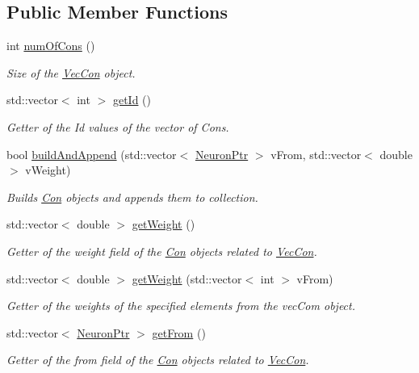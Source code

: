 \subsection*{Public Member Functions}
\begin{DoxyCompactItemize}
\item 
int \hyperlink{class_vec_con_aa9a397520b07fbeead0b6d252c1ea882}{numOfCons} ()
\begin{DoxyCompactList}\small\item\em Size of the \hyperlink{class_vec_con}{VecCon} object. \end{DoxyCompactList}\item 
std::vector$<$ int $>$ \hyperlink{class_vec_con_a03d5dde143e166e68b01c9596573eb5f}{getId} ()
\begin{DoxyCompactList}\small\item\em Getter of the Id values of the vector of Cons. \end{DoxyCompactList}\item 
bool \hyperlink{class_vec_con_a2ab58248509550b1c99435a90ece59f1}{buildAndAppend} (std::vector$<$ \hyperlink{_a_m_o_r_e_8h_ac1ea936c2c7728eb382278131652fef4}{NeuronPtr} $>$ vFrom, std::vector$<$ double $>$ vWeight)
\begin{DoxyCompactList}\small\item\em Builds \hyperlink{class_con}{Con} objects and appends them to collection. \end{DoxyCompactList}\item 
std::vector$<$ double $>$ \hyperlink{class_vec_con_aafa37c30d566b8784ac84d23a14b5638}{getWeight} ()
\begin{DoxyCompactList}\small\item\em Getter of the weight field of the \hyperlink{class_con}{Con} objects related to \hyperlink{class_vec_con}{VecCon}. \end{DoxyCompactList}\item 
std::vector$<$ double $>$ \hyperlink{class_vec_con_a0de571e8fde8e354887e0b43b8d00772}{getWeight} (std::vector$<$ int $>$ vFrom)
\begin{DoxyCompactList}\small\item\em Getter of the weights of the specified elements from the vecCom object. \end{DoxyCompactList}\item 
std::vector$<$ \hyperlink{_a_m_o_r_e_8h_ac1ea936c2c7728eb382278131652fef4}{NeuronPtr} $>$ \hyperlink{class_vec_con_aee24ad1e9f3a8af771bef14cac0bf71d}{getFrom} ()
\begin{DoxyCompactList}\small\item\em Getter of the from field of the \hyperlink{class_con}{Con} objects related to \hyperlink{class_vec_con}{VecCon}. \end{DoxyCompactList}\item 

\end{DoxyCompactItemize}

